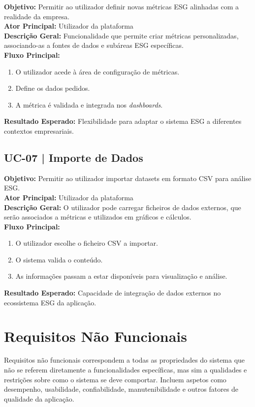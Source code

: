 \textbf{Objetivo:} Permitir ao utilizador definir novas métricas ESG alinhadas com a realidade da empresa.\\
\textbf{Ator Principal:} Utilizador da plataforma\\
\textbf{Descrição Geral:} Funcionalidade que permite criar métricas personalizadas, associando-as a fontes de dados e subáreas ESG específicas.\\
\textbf{Fluxo Principal:}
\begin{enumerate}
    \item O utilizador acede à área de configuração de métricas.
    \item Define os dados pedidos.
    \item A métrica é validada e integrada nos \textit{dashboards}.
\end{enumerate}
\textbf{Resultado Esperado:} Flexibilidade para adaptar o sistema ESG a diferentes contextos empresariais.

\subsection{UC-07 | Importe de Dados}

\textbf{Objetivo:} Permitir ao utilizador importar datasets em formato CSV para análise ESG.\\
\textbf{Ator Principal:} Utilizador da plataforma\\
\textbf{Descrição Geral:} O utilizador pode carregar ficheiros de dados externos, que serão associados a métricas e utilizados em gráficos e cálculos.\\
\textbf{Fluxo Principal:}
\begin{enumerate}
    \item O utilizador escolhe o ficheiro CSV a importar.
    \item O sistema valida o conteúdo.
    \item As informações passam a estar disponíveis para visualização e análise.
\end{enumerate}
\textbf{Resultado Esperado:} Capacidade de integração de dados externos no ecossistema ESG da aplicação.


\section{Requisitos Não Funcionais}

Requisitos não funcionais correspondem a todas as propriedades do sistema que não se referem diretamente a funcionalidades específicas, mas sim a qualidades e restrições sobre como o sistema se deve comportar. Incluem aspetos como desempenho, usabilidade, confiabilidade, manutenibilidade e outros fatores de qualidade da aplicação.

